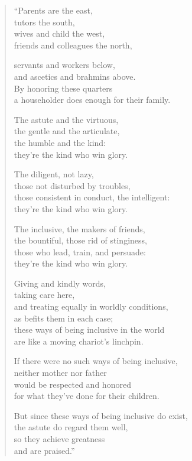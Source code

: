 \documentclass[12pt,openany]{book}%
\begin{document}
\begin{verse}%
“Parents are the east, \\
tutors the south, \\
wives and child the west, \\
friends and colleagues the north, 

servants and workers below, \\
and ascetics and brahmins above. \\
By honoring these quarters \\
a householder does enough for their family. 

The astute and the virtuous, \\
the gentle and the articulate, \\
the humble and the kind: \\
they’re the kind who win glory. 

The diligent, not lazy, \\
those not disturbed by troubles, \\
those consistent in conduct, the intelligent: \\
they’re the kind who win glory. 

The inclusive, the makers of friends, \\
the bountiful, those rid of stinginess, \\
those who lead, train, and persuade: \\
they’re the kind who win glory. 

Giving and kindly words, \\
taking care here, \\
and treating equally in worldly conditions, \\
as befits them in each case; \\
these ways of being inclusive in the world \\
are like a moving chariot’s linchpin. 

If there were no such ways of being inclusive, \\
neither mother nor father \\
would be respected and honored \\
for what they’ve done for their children. 

But since these ways of being inclusive do exist, \\
the astute do regard them well, \\
so they achieve greatness \\
and are praised.” 

%
\end{verse}
\end{document}
